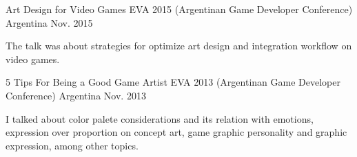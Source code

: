 

\begin{cventries}

  \cventry
    {Art Design for Video Games} %
    {EVA 2015 (Argentinan Game Developer Conference)} %
    {Argentina} %
    {Nov. 2015} %
    {
      \begin{cvitems} %
         \item {The talk was about strategies for optimize art design and integration workflow on video games.}
      \end{cvitems}
    }

 \cventry
    {5 Tips For Being a Good Game Artist} %
    {EVA 2013 (Argentinan Game Developer Conference)} %
    {Argentina} %
    {Nov. 2013} %
    {
      \begin{cvitems} %
        \item {I talked about color palete considerations and its relation with emotions, expression over proportion on concept art, game graphic personality and graphic expression, among other topics.}
      \end{cvitems}
    }

\end{cventries}
